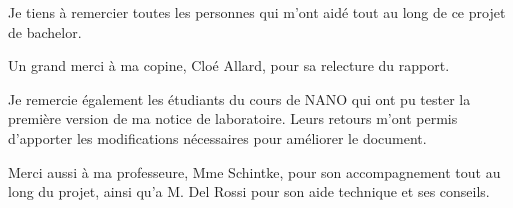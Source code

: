 Je tiens à remercier toutes les personnes qui m'ont aidé tout au long de ce projet de bachelor.

Un grand merci à ma copine, Cloé Allard, pour sa relecture du rapport.

Je remercie également les étudiants du cours de NANO qui ont pu tester la première version de ma notice de laboratoire. Leurs retours m'ont permis d'apporter les modifications nécessaires pour améliorer le document.

Merci aussi à ma professeure, Mme Schintke, pour son accompagnement tout au long du projet, ainsi qu'a M. Del Rossi pour son aide technique et ses conseils.